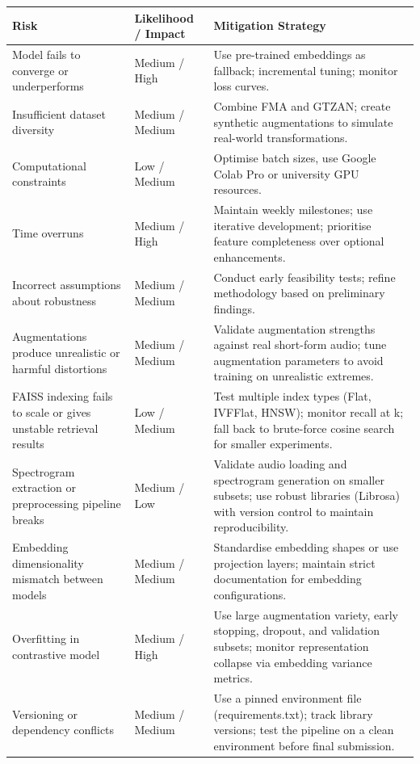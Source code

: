 \begin{table}[h!]
\centering
\begin{tabular}{|p{4cm}|p{3cm}|p{7cm}|}
\hline
\textbf{Risk} & \textbf{Likelihood / Impact} & \textbf{Mitigation Strategy} \\
\hline
Model fails to converge or underperforms & Medium / High & Use pre-trained embeddings as fallback; incremental tuning; monitor loss curves. \\
\hline
Insufficient dataset diversity & Medium / Medium & Combine FMA and GTZAN; create synthetic augmentations to simulate real-world transformations. \\
\hline
Computational constraints & Low / Medium & Optimise batch sizes, use Google Colab Pro or university GPU resources. \\
\hline
Time overruns & Medium / High & Maintain weekly milestones; use iterative development; prioritise feature completeness over optional enhancements. \\
\hline
Incorrect assumptions about robustness & Medium / Medium & Conduct early feasibility tests; refine methodology based on preliminary findings. \\
\hline
Augmentations produce unrealistic or harmful distortions 
& Medium / Medium 
& Validate augmentation strengths against real short-form audio; tune augmentation parameters to avoid training on unrealistic extremes. \\
\hline
FAISS indexing fails to scale or gives unstable retrieval results 
& Low / Medium 
& Test multiple index types (Flat, IVFFlat, HNSW); monitor recall at k; fall back to brute-force cosine search for smaller experiments. \\
\hline
Spectrogram extraction or preprocessing pipeline breaks 
& Medium / Low 
& Validate audio loading and spectrogram generation on smaller subsets; use robust libraries (Librosa) with version control to maintain reproducibility. \\
\hline
Embedding dimensionality mismatch between models 
& Medium / Medium 
& Standardise embedding shapes or use projection layers; maintain strict documentation for embedding configurations. \\
\hline
Overfitting in contrastive model 
& Medium / High 
& Use large augmentation variety, early stopping, dropout, and validation subsets; monitor representation collapse via embedding variance metrics. \\
\hline
Versioning or dependency conflicts 
& Medium / Medium 
& Use a pinned environment file (requirements.txt); track library versions; test the pipeline on a clean environment before final submission. \\

\end{tabular}
\end{table}

